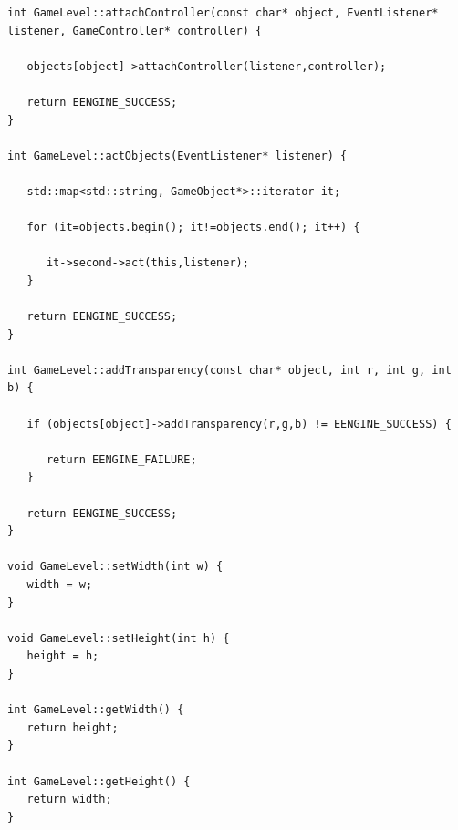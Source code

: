 \documentclass[12pt]{article}
\begin{document}
\begin{lstlisting}[breaklines]
int GameLevel::attachController(const char* object, EventListener* listener, GameController* controller) {

   objects[object]->attachController(listener,controller);
   
   return EENGINE_SUCCESS;
}

int GameLevel::actObjects(EventListener* listener) {
   
   std::map<std::string, GameObject*>::iterator it;
   
   for (it=objects.begin(); it!=objects.end(); it++) {
      
      it->second->act(this,listener);
   }
   
   return EENGINE_SUCCESS;
}

int GameLevel::addTransparency(const char* object, int r, int g, int b) {
   
   if (objects[object]->addTransparency(r,g,b) != EENGINE_SUCCESS) {
      
      return EENGINE_FAILURE;
   }
   
   return EENGINE_SUCCESS;
}

void GameLevel::setWidth(int w) {
   width = w;
}

void GameLevel::setHeight(int h) {
   height = h;
}

int GameLevel::getWidth() {
   return height;
}

int GameLevel::getHeight() {
   return width;
}
\end{lstlisting}
\end{document}
